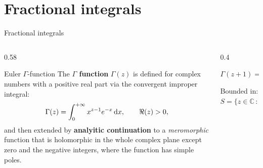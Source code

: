 \documentclass[aspectratio=169,xcolor=dvipsnames]{beamer}
\begin{document}
\section{Fractional integrals}

\begin{frame}{Fractional integrals}

\begin{columns}
\begin{column}{0.58\columnwidth}
\begin{alertblock}{Euler $\Gamma$-function}
The \textbf{$\Gamma$ function} $\Gamma(z)$ is defined for complex numbers with a
positive real part via the convergent improper integral:
\[
\Gamma(z) = \int_{0}^{+\infty} x^{z-1} e^{-x}\,{\rm d}x, \qquad \Re(z) > 0,
\]
and then extended by \textbf{analyitic continuation} to a \emph{meromorphic} function that is holomorphic in the whole complex plane except zero and the negative integers, where the function has simple poles.
\end{alertblock}
\end{column}
\begin{column}{0.4\columnwidth}
\centering



$\Gamma(z + 1) = z\, \Gamma(z)$

Bounded in: $S = \{z \in \mathbb{C} \,:\, \Re z \in [1,2)\}$
\end{column}
\end{columns}

\end{frame}
\end{document}
